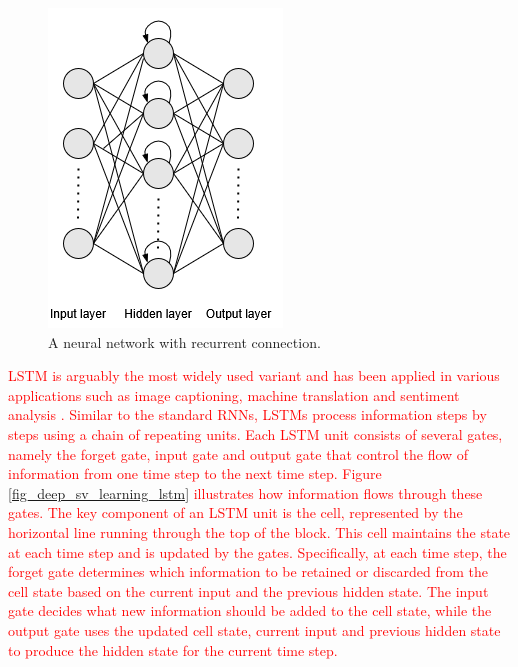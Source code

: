 \documentclass[preprint,12pt]{elsarticle}
\begin{document}
\begin{figure}[h!]
    \centering
    \includegraphics[scale=0.6]{fig_deep_sv_learning_rnn.png}
    \caption{A neural network with recurrent connection.}
    \label{fig_deep_sv_learning_rnn}
\end{figure}

\textcolor{red}{LSTM is arguably the most widely used variant and has been applied in various applications such as image captioning, machine translation and sentiment analysis \citep{van_houdt_review_2020}. Similar to the standard RNNs, LSTMs process information steps by steps using a chain of repeating units. Each LSTM unit consists of several gates, namely the forget gate, input gate and output gate that control the flow of information from one time step to the next time step. Figure \ref{fig_deep_sv_learning_lstm} illustrates how information flows through these gates. The key component of an LSTM unit is the cell, represented by the horizontal line running through the top of the block. This cell maintains the state at each time step and is updated by the gates. Specifically, at each time step, the forget gate determines which information to be retained or discarded from the cell state based on the current input and the previous hidden state. The input gate decides what new information should be added to the cell state, while the output gate uses the updated cell state, current input and previous hidden state to produce the hidden state for the current time step.}
\end{document}
